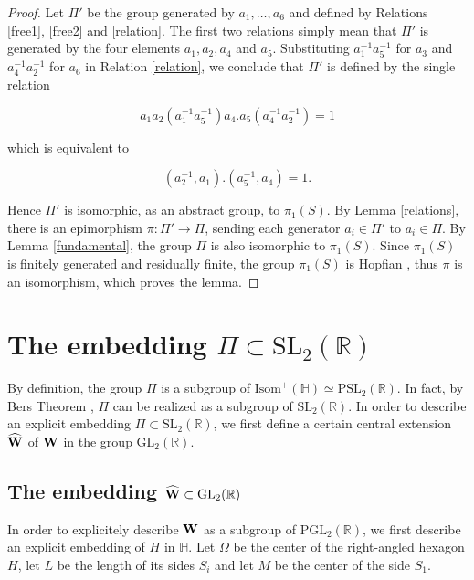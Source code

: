 \documentclass[10pt,a4paper]{amsart}
\newcommand{\HP}{\mathbb{H}}
\newcommand{\R}{\mathbb{R}}
\newcommand{\GL}{{\mathrm {GL}}}
\newcommand{\Isom}{\mathrm{Isom}}
\newcommand{\PGL}{{\mathrm {PGL}}}
\newcommand{\PSL}{{\mathrm {PSL}}}
\newcommand{\SL}{{\mathrm {SL}}}
\begin{document}
\begin{proof} Let $\Pi'$ be the group  generated by $a_1,\ldots, a_6$
and defined by Relations  \ref{free1}, \ref{free2} and \ref{relation}.
The first two 
relations simply
mean that
$\Pi'$ is generated by the four elements $a_1, a_2, a_4$ and $a_5$. Substituting $a_1^{-1}a_5^{-1}$ for $a_3$ and 
$a_4^{-1}a_2^{-1}$ for $a_6$ in Relation \ref{relation},
we conclude that $\Pi'$ is defined by the single relation

$$a_1a_2(a_1^{-1}a_5^{-1})a_4.a_5
(a_4^{-1}a_2^{-1})=1$$

\noindent which is equivalent to

$$(a_2^{-1}, a_1).(a_5^{-1}, a_4)=1.$$

\noindent Hence $\Pi'$ is isomorphic, as an abstract group,  to $\pi_1(S)$. By Lemma
\ref{relations}, there is  an epimorphism  $\pi:\Pi'\to \Pi$, sending each generator $a_i\in \Pi'$ to
$a_i\in\Pi$. By Lemma \ref{fundamental}, the group $\Pi$ is also isomorphic to $\pi_1(S)$.
Since $\pi_1(S)$ is finitely generated and residually finite, 
the group $\pi_1(S)$ is Hopfian \cite{Malcev}, thus
$\pi$ is an isomorphism, which proves the lemma.
\end{proof}






\section{The embedding $\Pi\subset \SL_2(\R)$}

By definition, the  group $\Pi$ is a subgroup
of $\Isom^+(\HP)\simeq \PSL_2(\R)$. In fact, by Bers Theorem
\cite{Bers}, $\Pi$ can be realized as a subgroup of
$\SL_2(\R)$. 
In order to describe an explicit
embedding $\Pi\subset\SL_2(\R)$, we first define  a certain central extension
$\widehat{\bf W}$ of $\bf{W}$ in the group
$\GL_2(\R)$.





\subsection{The embedding $\widehat{\bf W}\subset \GL_2(\R)$}

In order to explicitely describe $\bf{W}$ as a subgroup of $\PGL_2(\R)$,
we first describe an explicit embedding of $H$ in $\HP$.
Let $\Omega$ be the center of the right-angled hexagon $H$,
let $L$ be the length of its sides $S_i$  and let $M$ be the center of the side $S_1$.
\end{document}
